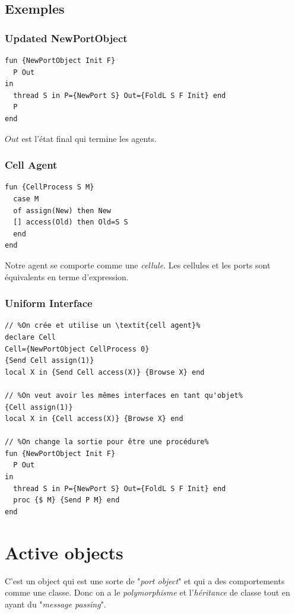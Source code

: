 \documentclass{report}
\begin{document}
\subsection{Exemples}
\subsubsection{Updated NewPortObject}
\begin{lstlisting}[escapechar=\%]
fun {NewPortObject Init F} 
  P Out
in
  thread S in P={NewPort S} Out={FoldL S F Init} end 
  P
end
\end{lstlisting}
$Out$ est l'état final qui termine les agents.

\subsubsection{Cell Agent}
\begin{lstlisting}[escapechar=\%]
fun {CellProcess S M} 
  case M 
  of assign(New) then New 
  [] access(Old) then Old=S S 
  end
end
\end{lstlisting}
Notre agent se comporte comme une \textit{cellule}. Les cellules et les ports sont équivalents en terme d'expression.

\subsubsection{Uniform Interface}
\begin{lstlisting}[escapechar=\%]
// %On crée et utilise un \textit{cell agent}%
declare Cell 
Cell={NewPortObject CellProcess 0} 
{Send Cell assign(1)}
local X in {Send Cell access(X)} {Browse X} end

// %On veut avoir les mêmes interfaces en tant qu'objet%
{Cell assign(1)} 
local X in {Cell access(X)} {Browse X} end

// %On change la sortie pour être une procédure%
fun {NewPortObject Init F} 
  P Out
in
  thread S in P={NewPort S} Out={FoldL S F Init} end 
  proc {$ M} {Send P M} end
end
\end{lstlisting}

\section{Active objects}
C'est un object qui est une sorte de "\textit{port object}" et qui a des comportements comme une classe. Donc on a le \textit{polymorphisme} et l'\textit{héritance} de classe tout en ayant du "\textit{message passing}".
\end{document}
